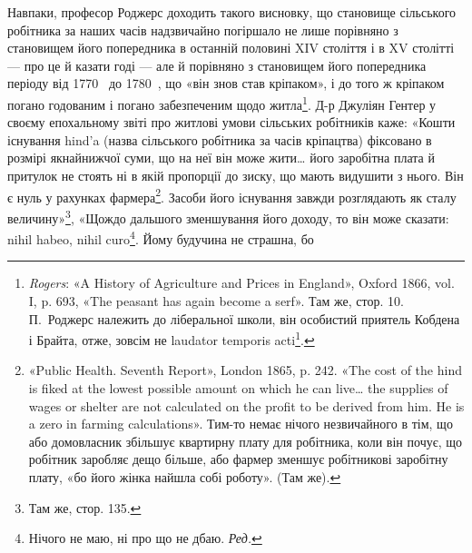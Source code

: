 Навпаки, професор Роджерс доходить такого висновку, що
становище сільського робітника за наших часів надзвичайно
погіршало не лише порівняно з становищем його попередника
в останній половині XIV століття і в XV столітті — про це й
казати годі — але й порівняно з становищем його попередника
періоду від 1770~ до 1780~, що «він знов став кріпаком», і
до того ж кріпаком погано годованим і погано забезпеченим щодо
житла\footnote{
\emph{Rogers}: «A History of Agriculture and Prices in England», Oxford
1866, vol. I, p. 693, «The peasant has again become a serf». Там же, стор. 10.
П.~Роджерс належить до ліберальної школи, він особистий приятель
Кобдена і Брайта, отже, зовсім не laudator temporis acti\footnote*{
— хвалій минулих часів. \emph{Ред.}
}.
}. Д-р Джуліян Гентер у своєму епохальному звіті про
житлові умови сільських робітників каже: «Кошти існування
hind’a (назва сільського робітника за часів кріпацтва) фіксовано
в розмірі якнайнижчої суми, що на неї він може жити\dots{} його
заробітна плата й притулок не стоять ні в якій пропорції до зиску,
що мають видушити з нього. Він є нуль у рахунках фармера\footnote{
«Public Health. Seventh Report», London 1865, p. 242. «The cost of
the hind is fiked at the lowest possible amount on which he can live\dots{} the
supplies of wages or shelter are not calculated on the profit to be derived
from him. He is a zero in farming calculations». Тим-то немає нічого незвичайного
в тім, що або домовласник збільшує квартирну плату для робітника,
коли він почує, що робітник заробляє дещо більше, або фармер
зменшує робітникові заробітну плату, «бо його жінка найшла собі
роботу». (Там же).
}.
Засоби його існування завжди розглядають як сталу величину»\footnote{
Там же, стор. 135.
},
«Щождо дальшого зменшування його доходу, то він може сказати:
nihil habeo, nihil curo\footnote*{
Нічого не маю, ні про що не дбаю. \emph{Ред.}
}. Йому будучина не страшна, бо
\parbreak{}  %
